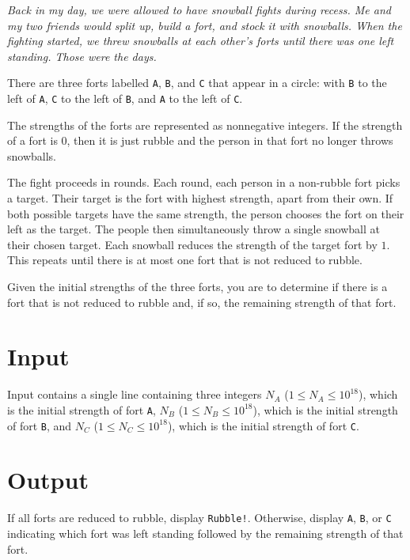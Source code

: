 
\textit{Back in my day, we were allowed to have snowball fights during recess.
Me and my two friends would split up, build a fort, and stock it with snowballs.
When the fighting started, we threw snowballs at each other's forts until there
was one left standing. Those were the days.}

There are three forts labelled \texttt{A}, \texttt{B}, and \texttt{C} that appear
in a circle: with \texttt{B} to the left of \texttt{A}, \texttt{C} to the left
of \texttt{B}, and \texttt{A} to the left of \texttt{C}.

The strengths of the forts are represented as nonnegative integers. If the
strength of a fort is $0$, then it is just rubble and the person in that fort
no longer throws snowballs.

The fight proceeds in rounds. Each round, each person in a non-rubble fort picks
a target. Their target is the fort with highest strength, apart from their own.
If both possible targets have the same strength, the person chooses the fort on
their left as the target. The people then simultaneously throw a single snowball
at their chosen target. Each snowball reduces the strength of the target fort by $1$.
This repeats until there is at most one fort that is not reduced to rubble.

Given the initial strengths of the three forts, you are to determine if there is a
fort that is not reduced to rubble and, if so, the remaining strength of that fort.

\section*{Input}

Input contains a single line containing three integers $N_A$
($1 \leq N_A \leq 10^{18}$), which is the initial strength of fort \texttt{A}, $N_B$
($1 \leq N_B \leq 10^{18}$), which is the initial strength of fort \texttt{B}, and $N_C$
($1 \leq N_C \leq 10^{18}$), which is the initial strength of fort \texttt{C}.

\section*{Output}
If all forts are reduced to rubble, display \texttt{Rubble!}. Otherwise, display
\texttt{A}, \texttt{B}, or \texttt{C} indicating which fort was left standing followed
by the remaining strength of that fort.
